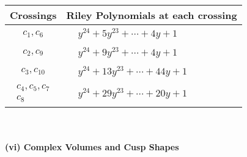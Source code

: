 \documentclass[1p]{elsarticle_modified}
\theoremstyle{definition}
\begin{document}
\begin{tabular}{m{50pt}|m{274pt}}
Crossings & \hspace{64pt}Riley Polynomials at each crossing \\
\hline $$\begin{aligned}c_{1},c_{6}\end{aligned}$$&$\begin{aligned}
&y^{24}+5 y^{23}+\cdots+4 y+1
\end{aligned}$\\
\hline $$\begin{aligned}c_{2},c_{9}\end{aligned}$$&$\begin{aligned}
&y^{24}+9 y^{23}+\cdots+4 y+1
\end{aligned}$\\
\hline $$\begin{aligned}c_{3},c_{10}\end{aligned}$$&$\begin{aligned}
&y^{24}+13 y^{23}+\cdots+44 y+1
\end{aligned}$\\
\hline $$\begin{aligned}c_{4},c_{5},c_{7}\\c_{8}\end{aligned}$$&$\begin{aligned}
&y^{24}+29 y^{23}+\cdots+20 y+1
\end{aligned}$\\
\hline
\end{tabular}\\~\\
\newpage\flushleft \textbf{(vi) Complex Volumes and Cusp Shapes}
\end{document}
